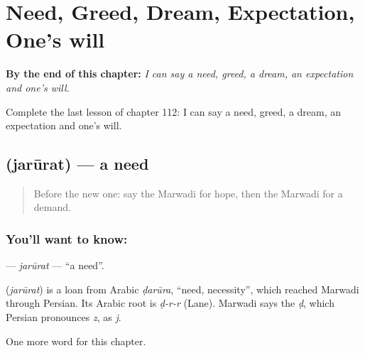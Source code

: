 
\chapter{Need, Greed, Dream, Expectation, One's will}
\label{ch:mw-need-greed-dream-expectation-one-s-will}

\begin{chapteropening}
\textbf{By the end of this chapter:} \emph{I can say a need, greed, a dream, an expectation and one's will.}

Complete the last lesson of chapter 112: I can say a need, greed, a dream, an expectation and one's will.
\end{chapteropening}

\section[\texorpdfstring{\mw{जरूरत} (jarūrat)}{जरूरत (jarūrat)}]{ (jarūrat) — a need}

\label{lesson:MW-C112-jarurat}



\begin{quote}
Before the new one: say the Marwadi for hope, then the Marwadi for a demand.
\end{quote}

\subsection*{You'll want to know: }
\textbf{} — \emph{jarūrat} — \textquotedblleft{}a need\textquotedblright{}.

\begin{cousinweb}
\textbf{} (\emph{jarūrat}) is a loan from Arabic \emph{ḍarūra}, \textquotedblleft{}need, necessity\textquotedblright{}, which reached Marwadi through Persian. Its Arabic root is \emph{ḍ-r-r} (Lane). Marwadi says the \emph{ḍ}, which Persian pronounces \emph{z}, as \emph{j}.
\end{cousinweb}

\begin{grammarlens}[title={What you've built}]
One more word for this chapter.
\end{grammarlens}

